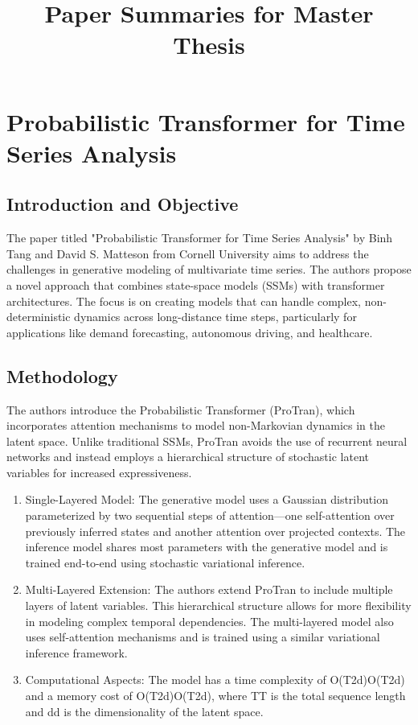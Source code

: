 \documentclass{article}
\title{Paper Summaries for Master Thesis}
\begin{document}
\maketitle

\tableofcontents

\newpage

\section{Probabilistic Transformer for Time Series Analysis}
\subsection{Introduction and Objective}

The paper titled "Probabilistic Transformer for Time Series Analysis" by Binh Tang and David S. Matteson from Cornell University aims to address the challenges in generative modeling of multivariate time series. The authors propose a novel approach that combines state-space models (SSMs) with transformer architectures. The focus is on creating models that can handle complex, non-deterministic dynamics across long-distance time steps, particularly for applications like demand forecasting, autonomous driving, and healthcare.

\subsection{Methodology}

The authors introduce the Probabilistic Transformer (ProTran), which incorporates attention mechanisms to model non-Markovian dynamics in the latent space. Unlike traditional SSMs, ProTran avoids the use of recurrent neural networks and instead employs a hierarchical structure of stochastic latent variables for increased expressiveness.
\begin{enumerate}
    \item Single-Layered Model: The generative model uses a Gaussian distribution parameterized by two sequential steps of attention—one self-attention over previously inferred states and another attention over projected contexts. The inference model shares most parameters with the generative model and is trained end-to-end using stochastic variational inference.
    \item Multi-Layered Extension: The authors extend ProTran to include multiple layers of latent variables. This hierarchical structure allows for more flexibility in modeling complex temporal dependencies. The multi-layered model also uses self-attention mechanisms and is trained using a similar variational inference framework.
    \item Computational Aspects: The model has a time complexity of O(T2d)O(T2d) and a memory cost of O(T2d)O(T2d), where TT is the total sequence length and dd is the dimensionality of the latent space.
\end{enumerate}
\end{document}
